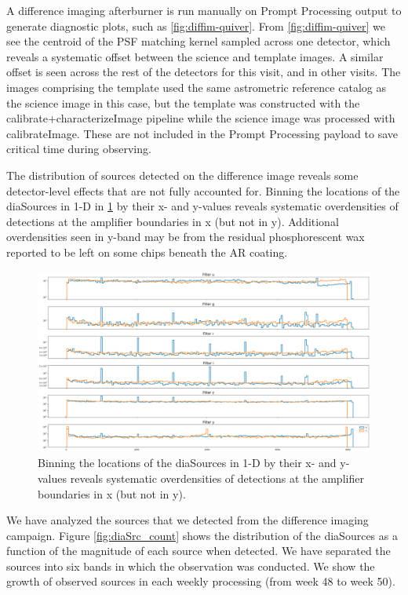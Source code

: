 A difference imaging afterburner is run manually on Prompt Processing output to generate diagnostic plots, such as \ref{fig:diffim-quiver}.
From \ref{fig:diffim-quiver} we see the centroid of the PSF matching kernel sampled across one detector, which reveals a systematic offset between the science and template images.
A similar offset is seen across the rest of the detectors for this visit, and in other visits.
The images comprising the template used the same astrometric reference catalog as the science image in this case, but the template was constructed with the calibrate+characterizeImage pipeline while the science image was processed with calibrateImage.
These are not included in the Prompt Processing payload to save critical time during observing.

The distribution of sources detected on the difference image reveals some detector-level effects that are not fully accounted for.
Binning the locations of the diaSources in 1-D in \ref{fig:diaSource-distribution} by their x- and y-values reveals systematic overdensities of detections at the amplifier boundaries in x (but not in y).
Additional overdensities seen in y-band may be from the residual phosphorescent wax reported to be left on some chips beneath the AR coating.

\begin{figure}
\includegraphics[width=\textwidth]{dia/figures/diaSource_distribution.png}
\caption{Binning the locations of the diaSources in 1-D by their x- and y-values reveals systematic overdensities of detections at the amplifier boundaries in x (but not in y). \label{fig:diaSource-distribution}}
\end{figure}

We have analyzed the sources that we detected from the difference imaging campaign. Figure \ref{fig:diaSrc_count} shows the distribution of the diaSources as a function of the magnitude of each source when detected. We have separated the sources into six bands in which the observation was conducted. We show the growth of observed sources in each weekly processing (from week 48 to week 50). 

